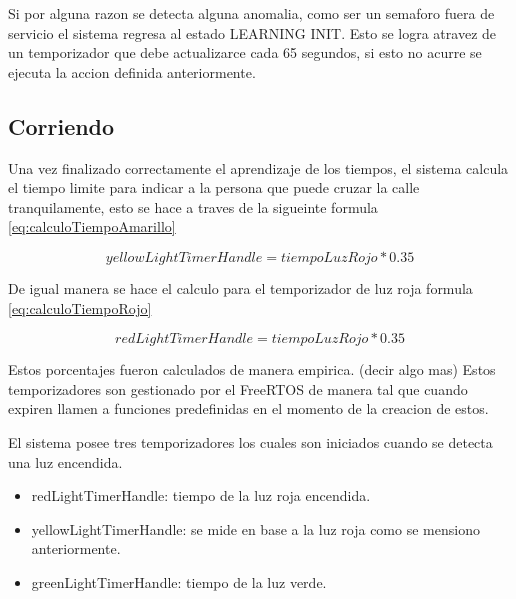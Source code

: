 Si por alguna razon se detecta alguna anomalia, como ser un semaforo fuera de servicio el sistema regresa al estado LEARNING INIT. Esto se logra atravez de un temporizador que debe actualizarce cada 65 segundos, si esto no acurre se ejecuta la accion definida anteriormente.

\subsection{Corriendo}
Una vez finalizado correctamente el aprendizaje de los tiempos, el sistema calcula el tiempo limite para indicar a la persona que puede cruzar la calle tranquilamente, esto se hace a traves de la sigueinte formula \ref{eq:calculoTiempoAmarillo}

\begin{equation}
\label{eq:calculoTiempoAmarillo}
yellowLightTimerHandle = tiempoLuzRojo * 0.35
\end{equation}

De igual manera se hace el calculo para el temporizador de luz roja  formula \ref{eq:calculoTiempoRojo}

\begin{equation}
\label{eq:calculoTiempoRojo}
redLightTimerHandle = tiempoLuzRojo * 0.35
\end{equation}

Estos porcentajes fueron calculados de manera empirica. (decir algo mas) 
Estos temporizadores son gestionado por el FreeRTOS de manera tal que cuando expiren llamen a funciones predefinidas en el momento de la creacion de estos.

El sistema posee tres temporizadores los cuales son iniciados cuando se detecta una luz encendida.

\begin{itemize}
\item redLightTimerHandle: tiempo de la luz roja encendida.
\item yellowLightTimerHandle: se mide en base a la luz roja como se mensiono anteriormente.
\item greenLightTimerHandle: tiempo de la luz verde.
\end{itemize}
